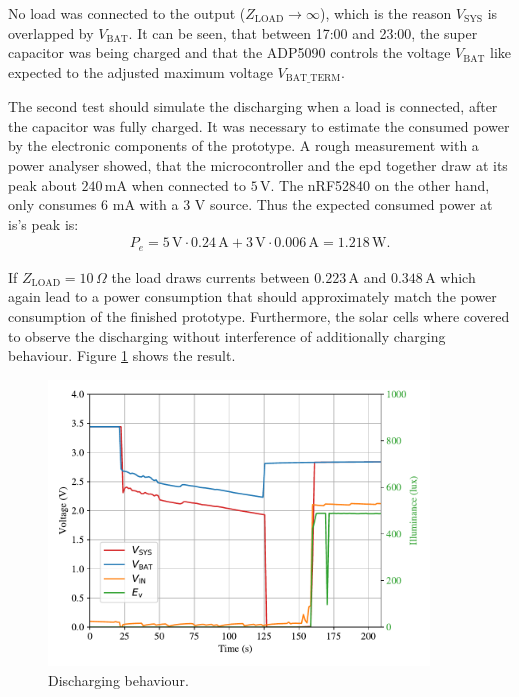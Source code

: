 No load was connected to the output ($Z_\text{LOAD} \to \infty$), which is the reason $V_{\text{SYS}}$ is overlapped by $V_{\text{BAT}}$.
It can be seen, that between 17:00 and 23:00, the super capacitor was being charged and
that the ADP5090 controls the voltage $V_{\text{BAT}}$ like expected to the adjusted maximum voltage $V_{\text{BAT\_TERM}}$.

The second test should simulate the discharging when a load is connected, after the capacitor was fully charged.
It was necessary to estimate the consumed power by the electronic components of the prototype.
A rough measurement with a power analyser showed, that the microcontroller and the \acl{epd} together draw at its peak about $240\,\text{mA}$ when connected to $5\,\text{V}$. The nRF52840 on the other hand, only consumes 6 mA with a 3 V source. Thus the expected consumed power at is's peak is:
\begin{align}
	P_{e} = 5\,\text{V}\cdot 0.24\,\text{A} + 3\,\text{V}\cdot 0.006\,\text{A} = 1.218\,\text{W}.
\end{align}
  

If $Z_{\text{LOAD}}=10\,\Omega$ the load draws currents between $0.223\,\text{A}$ and $0.348\,\text{A}$ which again lead to a power consumption that should approximately match the power consumption of the finished prototype.
Furthermore, the solar cells where covered to observe the discharging without interference of additionally charging behaviour.
Figure \ref{development:discharge} shows the result.
 
\begin{figure}[ht]
	\centering
	\includegraphics[width=0.9\textwidth]{4-development/hardware/graphics/entladen.pdf}
	\caption{Discharging behaviour.\label{development:discharge}}
\end{figure}

